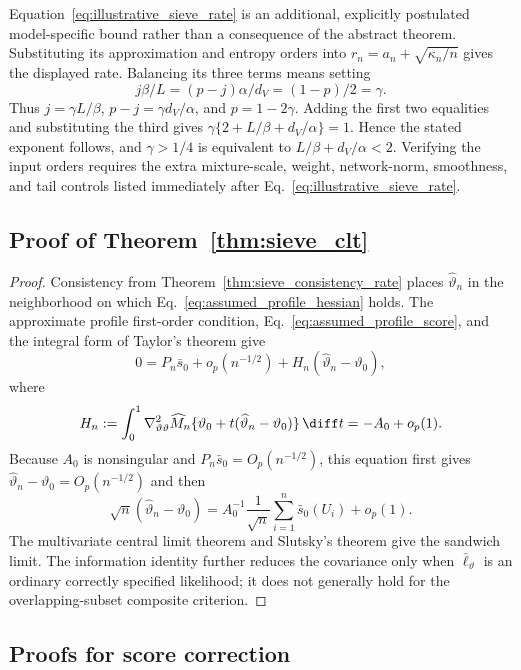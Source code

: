 Equation~\eqref{eq:illustrative_sieve_rate} is an additional, explicitly
postulated model-specific bound rather than a consequence of the abstract
theorem.  Substituting its approximation and entropy orders into
$r_n=a_n+\sqrt{\kappa_n/n}$ gives the displayed rate.  Balancing its three
terms means setting
\[
 j\beta/L=(p-j)\alpha/d_V=(1-p)/2=\gamma.
\]
Thus $j=\gamma L/\beta$, $p-j=\gamma d_V/\alpha$, and
$p=1-2\gamma$.  Adding the first two equalities and substituting the third
gives
$\gamma\{2+L/\beta+d_V/\alpha\}=1$.  Hence the stated exponent follows, and
$\gamma>1/4$ is equivalent to $L/\beta+d_V/\alpha<2$.  Verifying the input
orders requires the extra mixture-scale, weight, network-norm, smoothness,
and tail controls listed immediately after
Eq.~\eqref{eq:illustrative_sieve_rate}.

\subsection{Proof of Theorem~\ref{thm:sieve_clt}}

\begin{proof}
Consistency from Theorem~\ref{thm:sieve_consistency_rate} places
$\widehat\vartheta_n$ in the neighborhood on which
Eq.~\eqref{eq:assumed_profile_hessian} holds.  The approximate profile
first-order condition, Eq.~\eqref{eq:assumed_profile_score}, and the integral
form of Taylor's theorem give
\[
 0=P_n\bar s_0+o_p(n^{-1/2})
 +H_n(\widehat\vartheta_n-\vartheta_0),
\]
where
\[
 H_n:=\int_0^1\nabla^2_{\vartheta\vartheta}\widehat M_n
 \{\vartheta_0+t(\widehat\vartheta_n-\vartheta_0)\}\,\diff t
 =-A_0+o_p(1).
\]
Because $A_0$ is nonsingular and
$P_n\bar s_0=O_p(n^{-1/2})$, this equation first gives
$\widehat\vartheta_n-\vartheta_0=O_p(n^{-1/2})$ and then
\[
 \sqrt n(\widehat\vartheta_n-\vartheta_0)
 =A_0^{-1}\frac1{\sqrt n}\sum_{i=1}^n\bar s_0(U_i)+o_p(1).
\]
The multivariate central limit theorem and Slutsky's theorem give the
sandwich limit.  The information identity further reduces the covariance
only when $\bar\ell_\vartheta$ is an ordinary correctly specified likelihood;
it does not generally hold for the overlapping-subset composite criterion.
\end{proof}

\subsection{Proofs for score correction}


